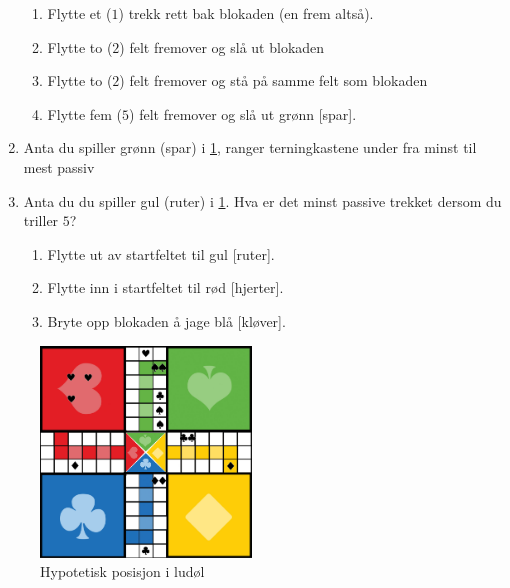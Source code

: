 \documentclass[10pt,a4paper,norsk,openany]{book}
\begin{document}
\begin{enumerate}
\begin{enumerate}
      \item Flytte et ($1$) trekk rett bak blokaden (en frem altså).
      \item Flytte to ($2$) felt fremover og slå ut blokaden
      \item Flytte to ($2$) felt fremover og stå på samme felt som blokaden
      \item Flytte fem
        ($5$) felt fremover og slå ut grønn [spar].
    \end{enumerate}
  \item Anta du spiller grønn (spar) i \cref{fig:ludolbrett-1}, ranger
    terningkastene under fra minst til mest passiv
      \item Anta du du spiller gul (ruter) i \cref{fig:ludolbrett-1}. Hva er det
    minst passive trekket dersom du triller $5$?
    \begin{enumerate}
      \item Flytte ut av startfeltet til gul [ruter].
      \item Flytte inn i startfeltet til rød [hjerter].
      \item Bryte opp blokaden å jage blå [kløver].
    \end{enumerate}
\end{enumerate}

\begin{figure}[htbp!]
  \centering
  \includegraphics[width=0.5\textwidth]{ludobrett-2}
  \caption{Hypotetisk posisjon i ludøl}
  \label{fig:ludolbrett-1}
\end{figure}

\newpage
\end{document}
